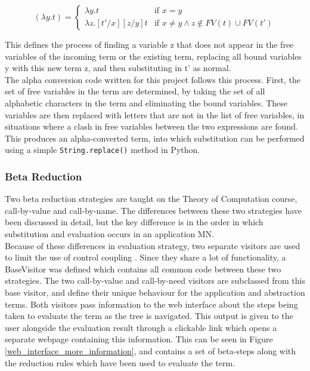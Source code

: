 \documentclass[a4paper,11pt]{report}
\begin{document}
\begin{equation*}
[t'/x](\lambda y.t)=\begin{cases}
\lambda y.t & \text{if $x=y$}\\
\lambda z.[t'/x][z/y]t & \text{if $x\ne y \land z\notin FV(t) \cup FV(t')$}
\end{cases}
\end{equation*}

This defines the process of finding a variable z that does not appear in the free variables of the incoming term or the existing term, replacing all bound variables y with this new term z, and then substituting in t’ as normal.\\

The alpha conversion code written for this project follows this process. First, the set of free variables in the term are determined, by taking the set of all alphabetic characters in the term and eliminating the bound variables. These variables are then replaced with letters that are not in the list of free variables, in situations where a clash in free variables between the two expressions are found. This produces an alpha-converted term, into which substitution can be performed using a simple \texttt{String.replace()} method in Python.

\subsubsection{Beta Reduction}

Two beta reduction strategies are taught on the Theory of Computation course, call-by-value and call-by-name. The differences between these two strategies have been discussed in detail, but the key difference is in the order in which substitution and evaluation occurs in an application MN.\\

Because of these differences in evaluation strategy, two separate visitors are used to limit the use of control coupling \cite{Lethbridge2004}. Since they share a lot of functionality, a BaseVisitor was defined which contains all common code between these two strategies. The two call-by-value and call-by-need visitors are subclassed from this base visitor, and define their unique behaviour for the application and abstraction terms. Both visitors pass information to the web interface about the steps being taken to evaluate the term as the tree is navigated. This output is given to the user alongside the evaluation result through a clickable link which opens a separate webpage containing this information. This can be seen in Figure \ref{web_interface_more_information}, and contains a set of beta-steps along with the reduction rules which have been used to evaluate the term.\\
\end{document}
